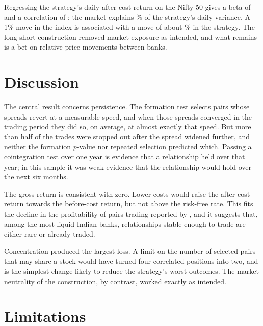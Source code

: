 \documentclass[11pt]{article}
\begin{document}
Regressing the strategy's daily after-cost return on the Nifty 50 gives a beta of
\Beta{} and a correlation of \CorrMkt; the market explains \RsqMkt\% of the
strategy's daily variance. A 1\% move in the index is associated with a move of
about \BetaMove\% in the strategy. The long-short construction removed market
exposure as intended, and what remains is a bet on relative price movements between
banks.

\section{Discussion}\label{sec:discussion}

The central result concerns persistence. The formation test selects pairs whose
spreads revert at a measurable speed, and when those spreads converged in the
trading period they did so, on average, at almost exactly that speed. But more than
half of the trades were stopped out after the spread widened further, and neither
the formation $p$-value nor repeated selection predicted which. Passing a cointegration test over one year is
evidence that a relationship held over that year; in this sample it was weak
evidence that the relationship would hold over the next six months.

The gross return is consistent with zero. Lower costs would raise the after-cost
return towards the before-cost return, but not above the risk-free rate. This fits
the decline in the profitability of pairs trading reported by \citet{do2010}, and it
suggests that, among the most liquid Indian banks, relationships stable enough to
trade are either rare or already traded.

Concentration produced the largest loss. A limit on the number of selected pairs
that may share a stock would have turned four correlated positions into two, and is
the simplest change likely to reduce the strategy's worst outcomes. The market
neutrality of the construction, by contrast, worked exactly as intended.

\section{Limitations}\label{sec:limits}
\end{document}

